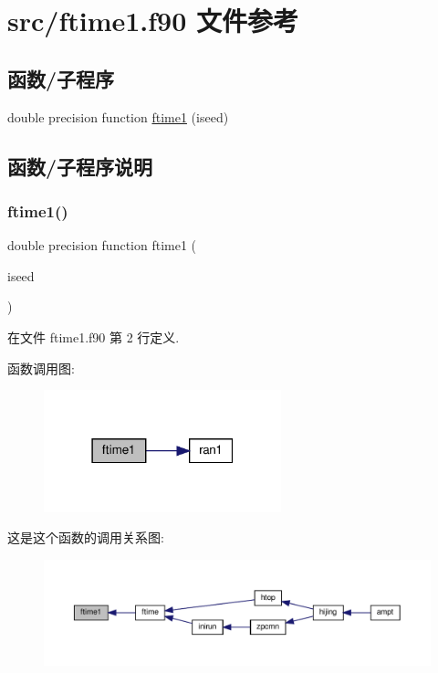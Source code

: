 \hypertarget{ftime1_8f90}{}\section{src/ftime1.f90 文件参考}
\label{ftime1_8f90}
\subsection*{函数/子程序}
\begin{DoxyCompactItemize}
\item 
double precision function \mbox{\hyperlink{ftime1_8f90_a9def8c56600c7a552083a665f0431d3a}{ftime1}} (iseed)
\end{DoxyCompactItemize}


\subsection{函数/子程序说明}
\mbox{\label{ftime1_8f90_a9def8c56600c7a552083a665f0431d3a}} 
\subsubsection{\texorpdfstring{ftime1()}{ftime1()}}
{\footnotesize\ttfamily double precision function ftime1 (\begin{DoxyParamCaption}\item[{}]{iseed }\end{DoxyParamCaption})}



在文件 ftime1.\+f90 第 2 行定义.

函数调用图\+:
\nopagebreak
\begin{figure}[H]
\begin{center}
\leavevmode
\includegraphics[width=195pt]{ftime1_8f90_a9def8c56600c7a552083a665f0431d3a_cgraph}
\end{center}
\end{figure}
这是这个函数的调用关系图\+:
\nopagebreak
\begin{figure}[H]
\begin{center}
\leavevmode
\includegraphics[width=350pt]{ftime1_8f90_a9def8c56600c7a552083a665f0431d3a_icgraph}
\end{center}
\end{figure}
